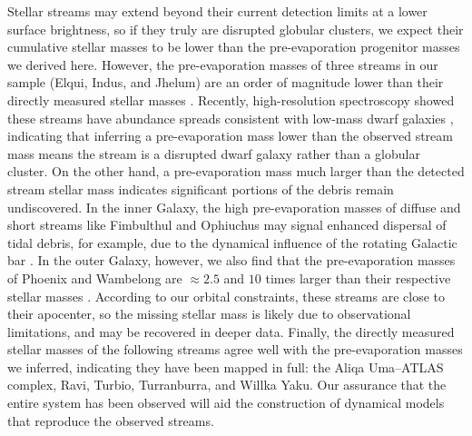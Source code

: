 \documentclass[twocolumn]{aastex63}
\begin{document}
Stellar streams may extend beyond their current detection limits at a lower surface brightness, so if they truly are disrupted globular clusters, we expect their cumulative stellar masses to be lower than the pre-evaporation progenitor masses we derived here.
However, the pre-evaporation masses of three streams in our sample (Elqui, Indus, and Jhelum) are an order of magnitude lower than their directly measured stellar masses \citep{shipp:2018}.
Recently, high-resolution spectroscopy showed these streams have abundance spreads consistent with low-mass dwarf galaxies \citep{ji:2020}, indicating that inferring a pre-evaporation mass lower than the observed stream mass means the stream is a disrupted dwarf galaxy rather than a globular cluster.
On the other hand, a pre-evaporation mass much larger than the detected stream stellar mass indicates significant portions of the debris remain undiscovered.
In the inner Galaxy, the high pre-evaporation masses of diffuse and short streams like Fimbulthul and Ophiuchus may signal enhanced dispersal of tidal debris, for example, due to the dynamical influence of the rotating Galactic bar \citep{hattori:2016, price-whelan:2016}.
In the outer Galaxy, however, we also find that the pre-evaporation masses of Phoenix and Wambelong are $\approx2.5$ and $10$ times larger than their respective stellar masses \citep{shipp:2018}.
According to our orbital constraints, these streams are close to their apocenter, so the missing stellar mass is likely due to observational limitations, and may be recovered in deeper data.
Finally, the directly measured stellar masses of the following streams agree well with the pre-evaporation masses we inferred, indicating they have been mapped in full: the Aliqa Uma--ATLAS complex, Ravi, Turbio, Turranburra, and Willka Yaku.
Our assurance that the entire system has been observed will aid the construction of dynamical models that reproduce the observed streams.
\end{document}
